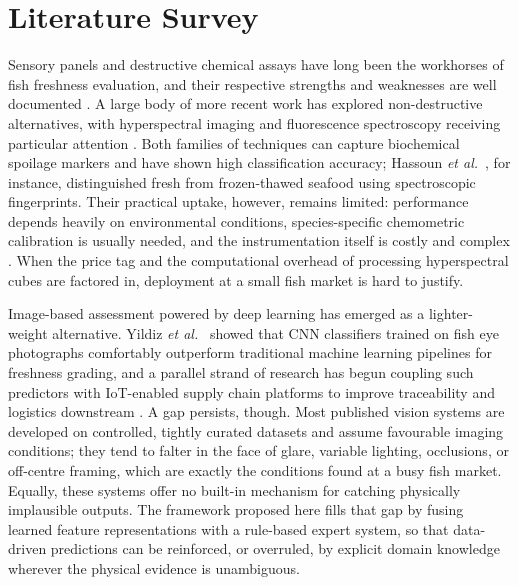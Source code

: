 \documentclass[conference]{IEEEtran}
\begin{document}
\section{Literature Survey}
Sensory panels and destructive chemical assays have long been the workhorses of fish freshness evaluation, and their respective strengths and weaknesses are well documented \cite{ref1, ref6, ref18}. A large body of more recent work has explored non-destructive alternatives, with hyperspectral imaging and fluorescence spectroscopy receiving particular attention \cite{ref4, ref5, ref7, ref8, ref9, ref10, ref11, ref12, ref14}. Both families of techniques can capture biochemical spoilage markers and have shown high classification accuracy; Hassoun \textit{et al.}~\cite{ref7}, for instance, distinguished fresh from frozen-thawed seafood using spectroscopic fingerprints. Their practical uptake, however, remains limited: performance depends heavily on environmental conditions, species-specific chemometric calibration is usually needed, and the instrumentation itself is costly and complex \cite{ref2, ref15, ref16, ref17}. When the price tag and the computational overhead of processing hyperspectral cubes are factored in, deployment at a small fish market is hard to justify.

Image-based assessment powered by deep learning has emerged as a lighter-weight alternative. Yildiz \textit{et al.}~\cite{ref19} showed that CNN classifiers trained on fish eye photographs comfortably outperform traditional machine learning pipelines for freshness grading, and a parallel strand of research has begun coupling such predictors with IoT-enabled supply chain platforms to improve traceability and logistics downstream \cite{ref20}. A gap persists, though. Most published vision systems are developed on controlled, tightly curated datasets and assume favourable imaging conditions; they tend to falter in the face of glare, variable lighting, occlusions, or off-centre framing, which are exactly the conditions found at a busy fish market. Equally, these systems offer no built-in mechanism for catching physically implausible outputs. The framework proposed here fills that gap by fusing learned feature representations with a rule-based expert system, so that data-driven predictions can be reinforced, or overruled, by explicit domain knowledge wherever the physical evidence is unambiguous.

\end{document}
